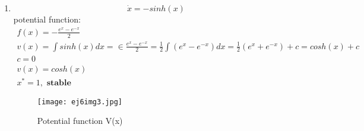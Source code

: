 \documentclass[a4paper,10pt]{article}
\begin{document}
\begin{enumerate}
\begin{enumerate}
                
        \newpage        
        \item 
            \begin{equation}
                \dot{x}=-sinh(x)
            \end{equation} 
            potential function:
            \begin{equation}
                \begin{aligned}
                    f(x)= -\frac{e^{x}-e^{-x}}{2}\\
                    v(x)=\int sinh(x)dx=\in\frac{e^{x}-e^{-x}}{2}=\frac{1}{2}\int (e^{x}- e^{-x})dx=\frac{1}{2}(e^{x}+ e^{-x}) + c= cosh(x) + c\\
                    c=0\\
                    v(x)=cosh(x)\\
                    x^{*}=1,\textbf{ stable}
                \end{aligned}
            \end{equation}
                \begin{figure}[h]
                    \centering
                    \texttt{[image: ej6img3.jpg]}
                    \caption{Potential function V(x)}
                    \label{fig:mesh1}
                \end{figure}        
                
    \end{enumerate}
             
	
	
	
\end{enumerate}
\end{document}
